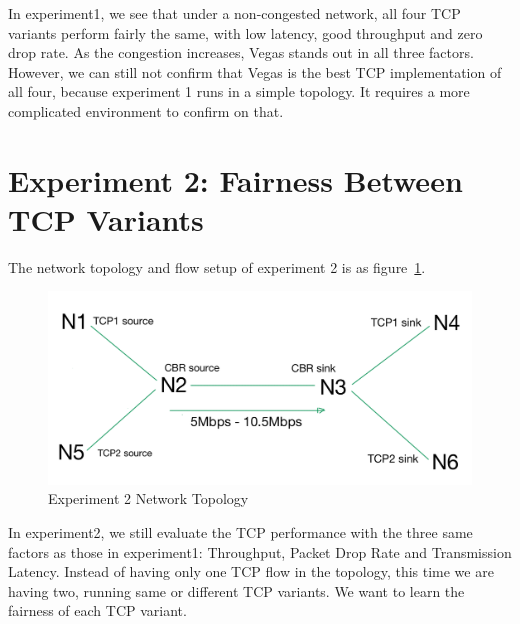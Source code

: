 \documentclass[10pt, conference]{lib/IEEEtran}
\begin{document}
In experiment1, we see that under a non-congested network, all four TCP
variants perform fairly the same, with low latency, good throughput and
zero drop rate. As the congestion increases, Vegas stands out in all 
three factors. However, we can still not confirm that Vegas is the best
TCP implementation of all four, because experiment 1 runs in a simple
topology. It requires a more complicated environment to confirm on that.




\section{Experiment 2: Fairness Between TCP Variants}
The network topology and flow setup of experiment 2 is as figure~\ref{fig:exp2_tpg}.
\begin{figure}[!htb]
    \centering
    \includegraphics[width=0.8\linewidth]{images/top_exp2.png}
    \caption{Experiment 2 Network Topology}
    \label{fig:exp2_tpg}
\end{figure}
In experiment2, we still evaluate the TCP performance with the three 
same factors as those in experiment1: Throughput, Packet Drop Rate and 
Transmission Latency. Instead of having only one TCP flow in the 
topology, this time we are having two, running same or different TCP 
variants. We want to learn the fairness of each TCP variant.
\end{document}

